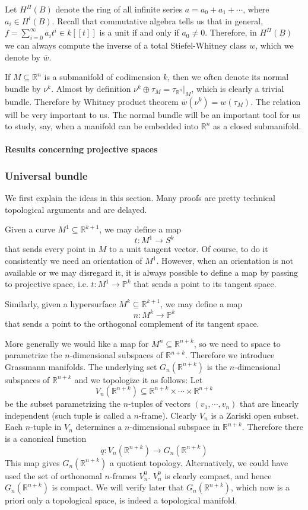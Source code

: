 \documentclass[12pt]{article}
\theoremstyle{plain}
\theoremstyle{definition}
\newcommand{\IP}{\mathbb{P}}
\newcommand{\IR}{\mathbb{R}}
\newcommand{\<}{\langle}
\renewcommand{\>}{\rangle}
\newcommand{\wb}{\overline}
\begin{document}
Let $H^\Pi (B)$ denote the ring of all infinite series $a = a_0 + a_1 + \cdots$, where $a_i \in H^i(B)$. Recall that commutative algebra tells us that in general, $f  = \sum_{i = 0}^\infty a_i t^i \in k[[t]]$ is a unit if and only if $a_0 \neq 0$. Therefore, in  $H^\Pi (B)$ we can always compute the inverse of a total Stiefel-Whitney class $w$, which we denote by $\wb{w}$. 

If $M \subseteq \IR^n$ is a submanifold of codimension $k$, then we often denote its normal bundle by $\nu^k$. Almost by definition $\nu^k \oplus \tau_M = \tau_{\IR^n}|_{M}$, which is clearly a trivial bundle. Therefore by Whitney product theorem $\wb{w}(\nu^k) = w(\tau_M)$. The relation will be very important to us. The normal bundle will be an important tool for us to study, say, when a manifold can be embedded into $\IR^n$ as a closed submanifold. 

\paragraph{Results concerning projective spaces}



\subsubsection{Universal bundle}
We first explain the ideas in this section. Many proofs are pretty technical topological arguments and are delayed. 

Given a curve $M^1 \subseteq \IR^{k + 1}$, we may define a map $$t : M^1 \to S^k$$ that sends every point in $M$ to a unit tangent vector. Of course, to do it consistently we need an orientation of $M^1$. However, when an orientation is not available or we may disregard it, it is always possible to define a map by passing to projective space, i.e. $t : M^1 \to \IP^k$ that sends a point to its tangent space. 

Similarly, given a hypersurface $M^k \subseteq \IR^{k + 1}$, we may define a map $$ n : M^k \to \IP^k$$ that sends a point to the orthogonal complement of its tangent space. 

More generally we would like a map for $M^n \subseteq \IR^{n + k}$, so we need to space to parametrize the $n$-dimensional subspaces of $\IR^{n + k}$. Therefore we introduce Grassmann manifolds. The underlying set $G_n(\IR^{n + k})$ is the $n$-dimensional subspaces of $\IR^{n + k}$ and we topologize it as follows: Let $$V_n(\IR^{n + k}) \subseteq \IR^{n + k} \times \cdots \times \IR^{n + k}$$ be the subset parametrizing the $n$-tuples of vectors $(v_1, \cdots, v_n)$ that are linearly independent (such tuple is called a $n$-frame). Clearly $V_n$ is a Zariski open subset. Each $n$-tuple in $V_n$ determines a $n$-dimensional subspace in $\IR^{n + k}$. Therefore there is a canonical function 
$$ q : V_n(\IR^{n + k}) \to G_n (\IR^{n + k}) $$ 
This map gives $G_n (\IR^{n + k})$ a quotient topology. Alternatively, we could have used the set of orthonomal $n$-frames $V^0_{n}$. $V^0_{n}$ is clearly compact, and hence $G_n (\IR^{n + k})$ is compact. We will verify later that $G_n (\IR^{n + k})$, which now is a priori only a topological space, is indeed a topological manifold. 
\end{document}
